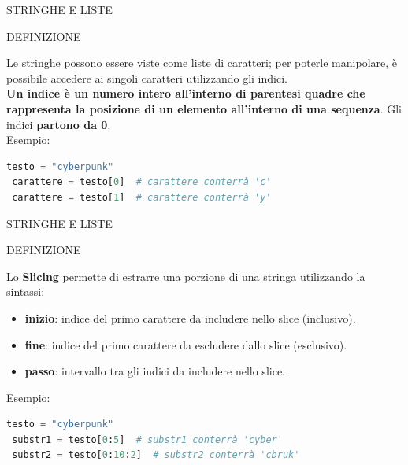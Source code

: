 \documentclass[aspectratio=1610]{beamer}
\begin{document}
\begin{frame}[fragile]{STRINGHE E LISTE}
    \begin{alertblock}{DEFINIZIONE}
        \begin{minipage}{0.98\linewidth}
            \justifying
            Le stringhe possono essere viste come liste di caratteri; per poterle manipolare, 
            è possibile accedere ai singoli caratteri utilizzando gli indici.\\
            \textbf{Un indice è un numero intero all'interno di parentesi quadre che rappresenta la posizione di un 
            elemento all'interno di una sequenza}. Gli indici \textbf{partono da 0}.\\
\pause
Esempio:
\begin{lstlisting}[language=Python]
 testo = "cyberpunk"
 carattere = testo[0]  # carattere conterrà 'c'
 carattere = testo[1]  # carattere conterrà 'y'
\end{lstlisting}
        \end{minipage}
    \end{alertblock}
\end{frame}

\begin{frame}[fragile]{STRINGHE E LISTE}
    \begin{alertblock}{DEFINIZIONE}
        \begin{minipage}{0.98\linewidth}
            \justifying
            Lo \textbf{Slicing} permette di estrarre una porzione di una stringa utilizzando la sintassi:\\
            \pause
            \begin{itemize}
                \item \textbf{inizio}: indice del primo carattere da includere nello slice (inclusivo).
                \pause
                \item \textbf{fine}: indice del primo carattere da escludere dallo slice (esclusivo).
                \pause
                \item \textbf{passo}: intervallo tra gli indici da includere nello slice.
            \end{itemize}
\pause
\raggedright
Esempio:
\begin{lstlisting}[language=Python]
 testo = "cyberpunk"
 substr1 = testo[0:5]  # substr1 conterrà 'cyber'
 substr2 = testo[0:10:2]  # substr2 conterrà 'cbruk'
\end{lstlisting}
        \end{minipage}
    \end{alertblock}
\end{frame}
\end{document}
